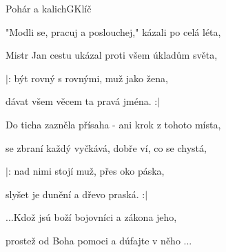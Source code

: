 \begin{song}{Pohár a kalich}{G}{Klíč}
\begin{SBVerse}
"Modli se, pracuj a poslouchej," kázali po celá léta,

Mistr Jan cestu ukázal proti všem úkladům světa,

$|$: být rovný s rovnými, muž jako žena,

   dávat všem věcem ta pravá jména. :$|$

\end{SBVerse}

\begin{SBVerse}

Do ticha zazněla přísaha - ani krok z tohoto místa,

se zbraní každý vyčkává, dobře ví, co se chystá,

$|$: nad nimi stojí muž, přes oko páska,

   slyšet je dunění a dřevo praská. :$|$

\end{SBVerse}

\begin{SBChorus}

...Kdož jsú boží bojovníci a zákona jeho,

prostež od Boha pomoci a dúfajte v něho ...

\end{SBChorus}

\end{song}

\clearpage
